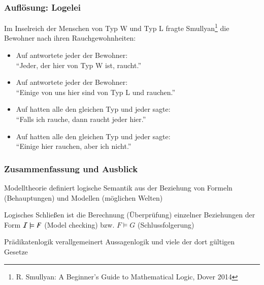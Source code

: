 \documentclass[aspectratio=1610,onlymath]{beamer}
\begin{document}
\begin{frame}\frametitle{Auflösung: Logelei}

Im Inselreich der Menschen von Typ W und Typ L fragte 
Smullyan\footnote{R. Smullyan: A Beginner's Guide to Mathematical Logic, Dover 2014} die Bewohner nach ihren Rauchgewohnheiten:

\begin{itemize}
\item Auf  antwortete jeder der Bewohner:\\ \alert{"`Jeder, der hier von Typ W ist, raucht."'}\\
%
\item Auf  antwortete jeder der Bewohner:\\ \alert{"`Einige von uns hier sind von Typ L und rauchen."'}\\
%
\item Auf  hatten alle den gleichen Typ und jeder sagte:\\ \alert{"`Falls ich rauche, dann raucht jeder hier."'}\\
%
\item Auf  hatten alle den gleichen Typ und jeder sagte:\\ \alert{"`Einige hier rauchen, aber ich nicht."'}\\
%
\end{itemize}

\end{frame}

\begin{frame}\frametitle{Zusammenfassung und Ausblick}

Modelltheorie definiert logische Semantik aus der Beziehung von Formeln (Behauptungen) und Modellen (möglichen Welten)
\bigskip


Logisches Schließen ist die Berechnung (Überprüfung) einzelner Beziehungen der Form $\mathcal{I}\models F$ (Model checking) bzw. $F\models G$ (Schlussfolgerung)\bigskip

Prädikatenlogik verallgemeinert Aussagenlogik und viele der dort gültigen Gesetze
\bigskip


\end{frame}
\end{document}
